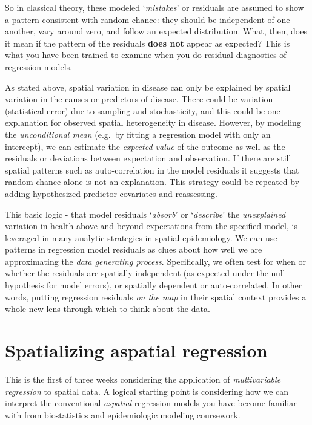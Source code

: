 \documentclass[
]{book}
\begin{document}
So in classical theory, these modeled `\emph{mistakes}' or residuals are assumed to show a pattern consistent with random chance: they should be independent of one another, vary around zero, and follow an expected distribution. What, then, does it mean if the pattern of the residuals \textbf{does not} appear as expected? This is what you have been trained to examine when you do residual diagnostics of regression models.

As stated above, spatial variation in disease can only be explained by spatial variation in the causes or predictors of disease. There could be variation (statistical error) due to sampling and stochasticity, and this could be one explanation for observed spatial heterogeneity in disease. However, by modeling the \emph{unconditional mean} (e.g.~by fitting a regression model with only an intercept), we can estimate the \emph{expected value} of the outcome as well as the residuals or deviations between expectation and observation. If there are still spatial patterns such as auto-correlation in the model residuals it suggests that random chance alone is not an explanation. This strategy could be repeated by adding hypothesized predictor covariates and reassessing.

This basic logic - that model residuals `\emph{absorb}' or `\emph{describe}' the \emph{unexplained} variation in health above and beyond expectations from the specified model, is leveraged in many analytic strategies in spatial epidemiology. We can use patterns in regression model residuals as clues about how well we are approximating the \emph{data generating process}. Specifically, we often test for when or whether the residuals are spatially independent (as expected under the null hypothesis for model errors), or spatially dependent or auto-correlated. In other words, putting regression residuals \emph{on the map} in their spatial context provides a whole new lens through which to think about the data.

\hypertarget{spatializing-aspatial-regression}{%
\section{Spatializing aspatial regression}\label{spatializing-aspatial-regression}}

This is the first of three weeks considering the application of \emph{multivariable regression} to spatial data. A logical starting point is considering how we can interpret the conventional \emph{aspatial} regression models you have become familiar with from biostatistics and epidemiologic modeling coursework.
\end{document}
